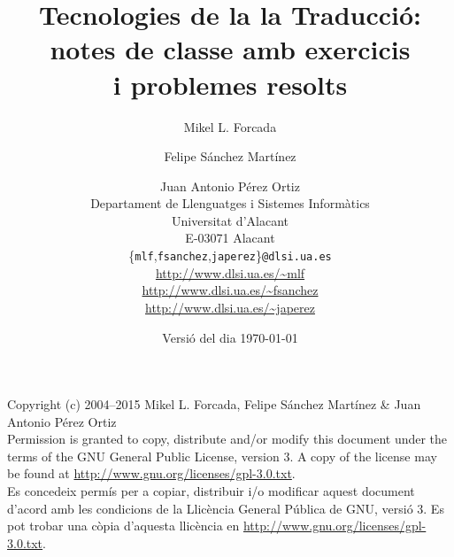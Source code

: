 \documentclass[11pt,a4paper]{book}
\newcommand{\com}[1]{\begin{quote}{\small\sf #1}\end{quote}}
\renewcommand{\com}[1]{}
\begin{document}
\frontmatter

\title{Tecnologies de la la Traducció: \\ notes de classe 
amb exercicis\\ i problemes resolts}
\author{Mikel L. Forcada \and Felipe Sánchez Martínez \and Juan Antonio Pérez Ortiz\\[2ex]
Departament de Llenguatges i Sistemes Informàtics\\
Universitat d'Alacant\\
E-03071 Alacant\\[2ex]
\{\texttt{mlf},\texttt{fsanchez},\texttt{japerez}\}\texttt{@dlsi.ua.es} \\
\url{http://www.dlsi.ua.es/~mlf} \\
\url{http://www.dlsi.ua.es/~fsanchez} \\
\url{http://www.dlsi.ua.es/~japerez}
}
\date{Versió del dia \today}
\maketitle
\newpage
\noindent Copyright (c) 2004--2015 Mikel L. Forcada, Felipe Sánchez Martínez \& Juan Antonio Pérez Ortiz \\[0.3cm]

\noindent Permission is granted to copy, distribute and/or modify this
document under the terms of the GNU General Public License, version 3.
A copy of the license may be found at \url{http://www.gnu.org/licenses/gpl-3.0.txt}. \\[0.3cm]

\noindent Es concedeix permís per a copiar, distribuir i/o modificar
aquest document d'acord amb les condicions de la Llicència General
Pública de GNU, versió 3. Es pot trobar una còpia d'aquesta llicència
en \url{http://www.gnu.org/licenses/gpl-3.0.txt}.  

\maketitle

\tableofcontents
\newpage

\mainmatter

\com{Lista (incompleta) de coses a fer:
  \begin{itemize}
  \item Integrar problemes resolts d'examens de prova i exercicis dels
    tests.
  \item Integrar anotacions de la llibreta de classe de 2002--2003
    (algunes ja integrades).
  \item Aprofitar material de transparències de màsters, etc. (alguns
    ja ficats).
  \item Citar els capítols corresponents del nou llibre de Somers.
  \item Revisar el llibre repassant la llista d'objectius del curs.
  \end{itemize}
}
\end{document}

